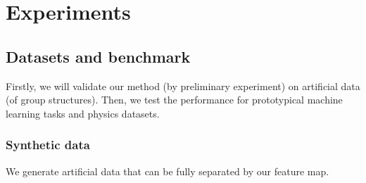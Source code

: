 

\section{Experiments}\label{sec:experiments}

\subsection{Datasets and benchmark}
Firstly, we will validate our method (by preliminary experiment) on artificial data (of group structures).
Then, we test the performance for prototypical machine learning tasks and physics datasets.

\subsubsection{Synthetic data}
We generate artificial data that can be fully separated by our feature map.

